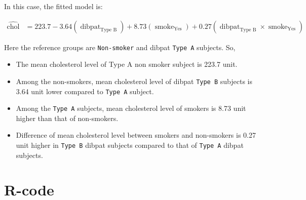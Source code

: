 \documentclass[
  12pt,
  oneside]{article}
\providecommand{\tightlist}{%
  \setlength{\itemsep}{0pt}\setlength{\parskip}{0pt}}
\begin{document}
In this case, the fitted model is:

\begin{equation}
\label{eq: eq6}
\begin{aligned}
\operatorname{\widehat{chol}} &= 223.7 - 3.64(\operatorname{dibpat}_{\operatorname{Type\ B}}) + 8.73(\operatorname{smoke}_{\operatorname{Yes}}) + 0.27(\operatorname{dibpat}_{\operatorname{Type\ B}} \times \operatorname{smoke}_{\operatorname{Yes}})
\end{aligned}
\end{equation}

Here the reference groups are \texttt{Non-smoker} and dibpat \texttt{Type\ A} subjects. So,

\begin{itemize}
\tightlist
\item
  The mean cholesterol level of Type A non smoker subject is 223.7 unit.
\item
  Among the non-smokers, mean cholesterol level of dibpat \texttt{Type\ B} subjects is 3.64 unit lower compared to \texttt{Type\ A} subject.
\item
  Among the \texttt{Type\ A} subjects, mean cholesterol level of smokers is 8.73 unit higher than that of non-smokers.
\item
  Difference of mean cholesterol level between smokers and non-smokers is 0.27 unit higher in \texttt{Type\ B} dibpat subjects compared to that of \texttt{Type\ A} dibpat subjects.
\end{itemize}

\clearpage

\hypertarget{r-code}{%
\section{R-code}\label{r-code}}
\end{document}
